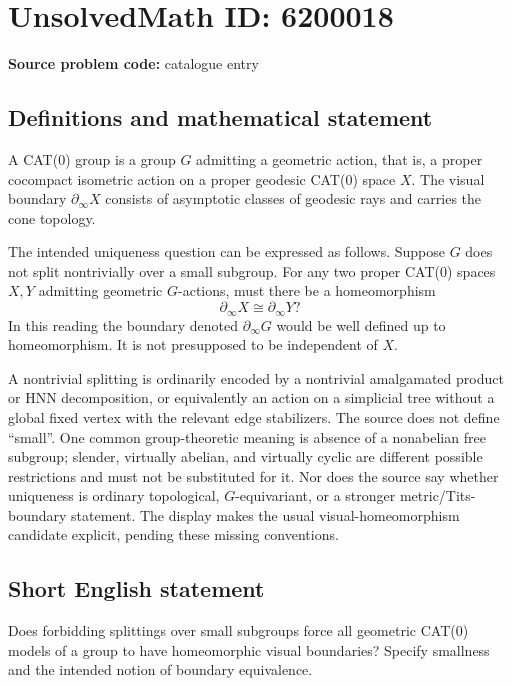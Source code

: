 \documentclass[11pt]{article}
\begin{document}
\section*{UnsolvedMath ID: 6200018}
\textbf{Source problem code:} catalogue entry
\subsection{Definitions and mathematical statement}
A CAT(0) group is a group $G$ admitting a geometric action, that is, a proper cocompact isometric action on a proper geodesic CAT(0) space $X$. The visual boundary $\partial_\infty X$ consists of asymptotic classes of geodesic rays and carries the cone topology.

The intended uniqueness question can be expressed as follows. Suppose $G$ does not split nontrivially over a small subgroup. For any two proper CAT(0) spaces $X,Y$ admitting geometric $G$-actions, must there be a homeomorphism
\[
\partial_\infty X\cong\partial_\infty Y?
\]
In this reading the boundary denoted $\partial_\infty G$ would be well defined up to homeomorphism. It is not presupposed to be independent of $X$.

A nontrivial splitting is ordinarily encoded by a nontrivial amalgamated product or HNN decomposition, or equivalently an action on a simplicial tree without a global fixed vertex with the relevant edge stabilizers. The source does not define ``small''. One common group-theoretic meaning is absence of a nonabelian free subgroup; slender, virtually abelian, and virtually cyclic are different possible restrictions and must not be substituted for it. Nor does the source say whether uniqueness is ordinary topological, $G$-equivariant, or a stronger metric/Tits-boundary statement. The display makes the usual visual-homeomorphism candidate explicit, pending these missing conventions.
\subsection{Short English statement}
Does forbidding splittings over small subgroups force all geometric CAT(0) models of a group to have homeomorphic visual boundaries? Specify smallness and the intended notion of boundary equivalence.
\end{document}
